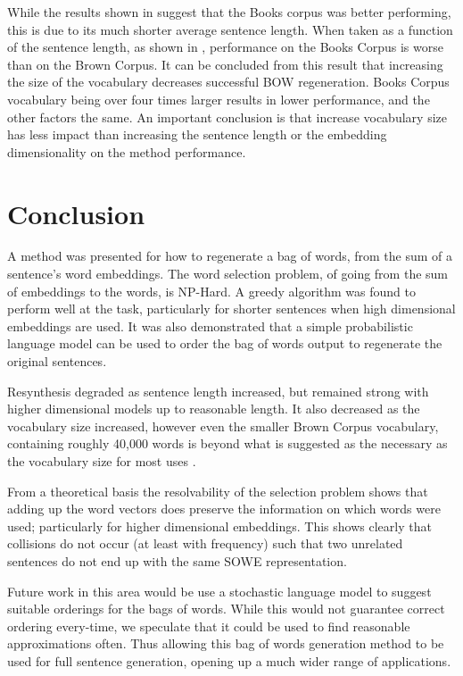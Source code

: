 \documentclass{llncs}
\begin{document}
While the results shown in  suggest that the Books corpus was better performing, this is due to its much shorter average sentence length. When taken as a function of the sentence length, as shown in ,  performance on the Books Corpus is worse than on the Brown Corpus. It can be concluded from this result that increasing the size of the vocabulary decreases successful BOW regeneration. Books Corpus vocabulary being over four times larger results in lower performance, and the other factors the same. An important conclusion is that increase vocabulary size has less impact than increasing the sentence length or the embedding dimensionality on the method performance.


\section{Conclusion} \label{conclusion}
A method was presented for how to regenerate a bag of words, from the sum of a sentence's word embeddings. The word selection problem, of going from the sum of embeddings to the words, is NP-Hard. A greedy algorithm was found to perform well at the task, particularly for shorter sentences when high dimensional embeddings are used. It was also demonstrated that a simple probabilistic language model can be used to order the bag of words output to regenerate the original sentences.

Resynthesis degraded as sentence length increased, but remained strong with higher dimensional models up to reasonable length. It also decreased as the vocabulary size increased, however even the smaller Brown Corpus vocabulary, containing roughly 40,000 words is beyond what is suggested as the necessary  as the vocabulary size for most uses \parencite{nation2006large}.

From a theoretical basis the resolvability of the selection problem shows that adding up the word vectors does preserve the information on which words were used; particularly for higher dimensional embeddings. This shows clearly that collisions do not occur (at least with frequency) such that two unrelated sentences do not end up with the same SOWE representation. 

Future work in this area would be use a stochastic language model to suggest suitable orderings for the bags of words. While this would not guarantee correct ordering every-time, we speculate that it could be used to find reasonable approximations often. Thus allowing this bag of words generation method to be used for full sentence generation, opening up a much wider range of applications.


\printbibliography
\end{document}

